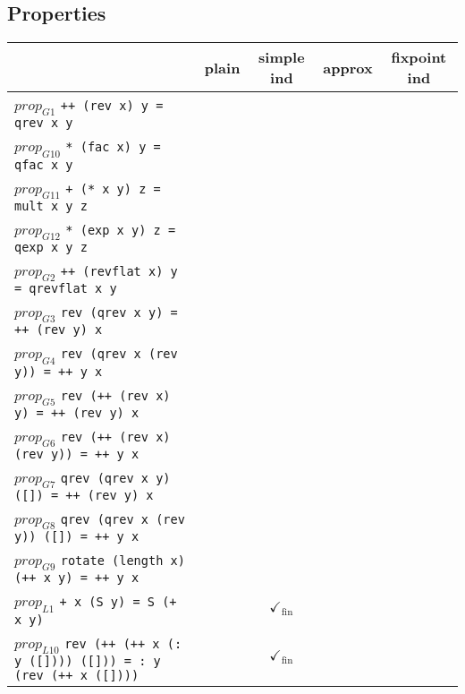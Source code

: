 \documentclass{article}
\begin{document}
\subsection*{Properties}
\begin{longtable}{p{10cm} || c | c | c | c | }
  & plain & simple ind & approx & fixpoint ind \\
\hline
$prop_{G1}$ \newline \verb`++ (rev x) y = qrev x y` &  &  &  &  \\
\hline
$prop_{G10}$ \newline \verb`* (fac x) y = qfac x y` &  &  &  &  \\
\hline
$prop_{G11}$ \newline \verb`+ (* x y) z = mult x y z` &  &  &  &  \\
\hline
$prop_{G12}$ \newline \verb`* (exp x y) z = qexp x y z` &  &  &  &  \\
\hline
$prop_{G2}$ \newline \verb`++ (revflat x) y = qrevflat x y` &  &  &  &  \\
\hline
$prop_{G3}$ \newline \verb`rev (qrev x y) = ++ (rev y) x` &  &  &  &  \\
\hline
$prop_{G4}$ \newline \verb`rev (qrev x (rev y)) = ++ y x` &  &  &  &  \\
\hline
$prop_{G5}$ \newline \verb`rev (++ (rev x) y) = ++ (rev y) x` &  &  &  &  \\
\hline
$prop_{G6}$ \newline \verb`rev (++ (rev x) (rev y)) = ++ y x` &  &  &  &  \\
\hline
$prop_{G7}$ \newline \verb`qrev (qrev x y) ([]) = ++ (rev y) x` &  &  &  &  \\
\hline
$prop_{G8}$ \newline \verb`qrev (qrev x (rev y)) ([]) = ++ y x` &  &  &  &  \\
\hline
$prop_{G9}$ \newline \verb`rotate (length x) (++ x y) = ++ y x` &  &  &  &  \\
\hline
$prop_{L1}$ \newline \verb`+ x (S y) = S (+ x y)` &  & $\checkmark_{\mathrm{fin}}$ &  &  \\
\hline
$prop_{L10}$ \newline \verb`rev (++ (++ x (: y ([]))) ([])) = : y (rev (++ x ([])))` &  & $\checkmark_{\mathrm{fin}}$ &  &  \\

\end{longtable}
\end{document}
